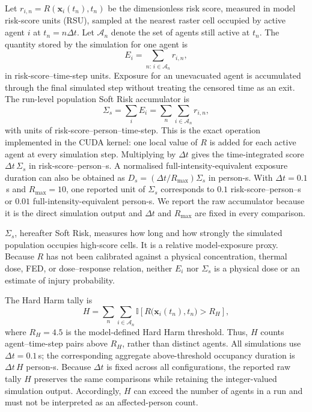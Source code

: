 \documentclass[preprint,12pt]{elsarticle}
\begin{document}
Let $r_{i,n}=R(\mathbf{x}_i(t_n),t_n)$ be the dimensionless risk score,
measured in model risk-score units (RSU),
sampled at the nearest raster cell occupied by active agent $i$ at
$t_n=n\Delta t$. Let $\mathcal{A}_n$ denote the set of agents still active
at $t_n$. The quantity stored by the simulation for one agent is
\begin{equation}
E_i = \sum_{n:\,i\in\mathcal{A}_n} r_{i,n},
\label{eq:exposure}
\end{equation}
in risk-score--time-step units. Exposure for an unevacuated agent is
accumulated through the final simulated step without treating the censored
time as an exit. The run-level population Soft Risk accumulator is
\begin{equation}
\Sigma_s = \sum_i E_i
= \sum_n\sum_{i\in\mathcal{A}_n} r_{i,n},
\label{eq:soft_risk_population}
\end{equation}
with units of risk-score--person--time-step. This is the exact operation
implemented in the CUDA kernel: one local value of $R$ is added for each
active agent at every simulation step. Multiplying by $\Delta t$ gives
the time-integrated score $\Delta t\,\Sigma_s$ in
risk-score--person--s. A normalised full-intensity-equivalent exposure
duration can also be obtained as
$D_s=(\Delta t/R_{\max})\Sigma_s$ in person-s. With
$\Delta t=0.1$\,s and $R_{\max}=10$, one reported unit of $\Sigma_s$
corresponds to $0.1$ risk-score--person--s or $0.01$
full-intensity-equivalent person-s. We report the raw accumulator because
it is the direct simulation output and $\Delta t$ and $R_{\max}$ are fixed
in every comparison.

$\Sigma_s$, hereafter Soft Risk, measures how long and how strongly the simulated population
occupies high-score cells. It is a relative model-exposure proxy. Because
$R$ has not been calibrated against a physical concentration, thermal
dose, FED, or dose--response relation, neither $E_i$ nor $\Sigma_s$ is a
physical dose or an estimate of injury probability.

The Hard Harm tally is
\begin{equation}
H = \sum_n \sum_{i\in\mathcal{A}_n}
\mathbb{I}\!\left[
R\!\big(\mathbf{x}_i(t_n),t_n\big)>R_H
\right],
\label{eq:threshold_exceedance}
\end{equation}
where $R_H=4.5$ is the model-defined Hard Harm threshold. Thus,
$H$ counts agent--time-step pairs above $R_H$, rather than distinct
agents. All simulations use $\Delta t=0.1$\,s; the corresponding
aggregate above-threshold occupancy duration is $\Delta t\,H$ person-s. Because
$\Delta t$ is fixed across all configurations, the reported raw tally
$H$ preserves the same comparisons while retaining the integer-valued
simulation output. Accordingly, $H$ can exceed the number of agents in
a run and must not be interpreted as an affected-person count.
\end{document}
